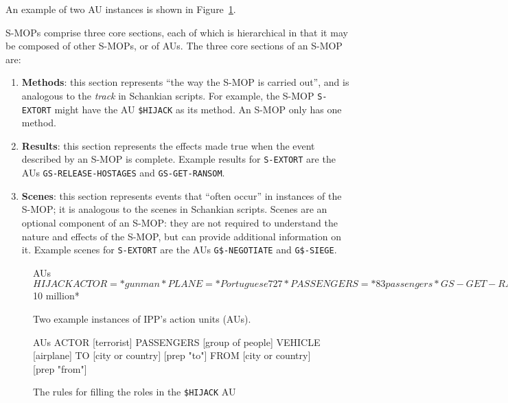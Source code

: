 An example of two AU instances is shown in Figure~\ref{fig:ippaus}.

S-MOPs comprise three core sections, each of which is hierarchical in that it may be composed of other S-MOPs, or of AUs.
The three core sections of an S-MOP are:

\begin{enumerate}
    \item \textbf{Methods}: this section represents ``the way the S-MOP is carried out'', and is analogous to the \textit{track} in Schankian scripts. For example, the S-MOP \texttt{S-EXTORT} might have the AU \texttt{\$HIJACK} as its method. An S-MOP only has one method.
    
    \item \textbf{Results}: this section represents the effects made true when the event described by an S-MOP is complete. Example results for \texttt{S-EXTORT} are the AUs \texttt{GS-RELEASE-HOSTAGES} and \texttt{GS-GET-RANSOM}.
    
    \item \textbf{Scenes}: this section represents events that ``often occur'' in instances of the S-MOP; it is analogous to the scenes in Schankian scripts. Scenes are an optional component of an S-MOP: they are not required to understand the nature and effects of the S-MOP, but can provide additional information on it. Example scenes for \texttt{S-EXTORT} are the AUs \texttt{G\$-NEGOTIATE} and \texttt{G\$-SIEGE}.
\end{enumerate}


\begin{figure}
    \centering
  \begin{SaveVerbatim}{AUs}
$HIJACK
    ACTOR       = *gunman*
    PLANE       = *Portuguese 727*
    PASSENGERS  = *83 passengers*

GS-GET-RANSOM
    ACTOR       = *gunman*
    AMOUNT      = *$10 million*
\end{SaveVerbatim}
  \setlength{\fboxsep}{5mm}
    \caption{Two example instances of IPP's action units (AUs).}
    \label{fig:ippaus}
\end{figure}

\begin{figure}
    \centering
  \begin{SaveVerbatim}{AUs}
ACTOR       [terrorist]
PASSENGERS  [group of people]
VEHICLE     [airplane]
TO          [city or country] [prep "to"]
FROM        [city or country] [prep "from"]
\end{SaveVerbatim}
  \setlength{\fboxsep}{5mm}
    \caption{The rules for filling the roles in the \texttt{\$HIJACK} AU}
    \label{fig:ippaurolefill}
\end{figure}

